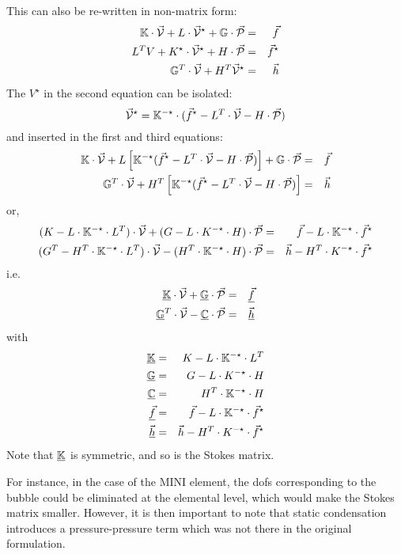 This can also be re-written in non-matrix form:
\begin{eqnarray}
{\mathbb{K}} \cdot \vec{\cal V} + L \cdot \vec{\cal V}^\star + {\mathbb{G}} \cdot \vec{\cal P} &=& \vec{f} \\
L^T V + K^\star \cdot  \vec{\cal V}^\star + H \cdot \vec{\cal P} &=& \vec{f}^\star \\
{\mathbb{G}}^T \cdot \vec{\cal V} + H^T \vec{\cal V}^\star &=& \vec{h}
\end{eqnarray}
The $V^\star$ in the second equation can be isolated:
\[
\vec{\cal V}^\star = {\mathbb{K}}^{-\star} \cdot ( \vec{f}^\star - L^T \cdot \vec{\cal V} - H \cdot \vec{\cal P})
\]
and inserted in the first and third equations:
\begin{eqnarray}
{\mathbb{K}} \cdot \vec{\cal V} + L \left[ {\mathbb{K}}^{-\star} ( \vec{f}^\star - L^T \cdot \vec{\cal V} - H \cdot \vec{\cal P} )  \right] + {\mathbb{G}} \cdot \vec{\cal P} &=& \vec{f} \\
{\mathbb{G}}^T \cdot \vec{\cal V} + H^T \left[  {\mathbb{K}}^{-\star} ( \vec{f}^\star - L^T \cdot \vec{\cal V} - H \cdot \vec{\cal P}) \right]  &=& \vec{h}
\end{eqnarray}
or,
\begin{eqnarray}
(K-L\cdot {\mathbb{K}}^{-\star} \cdot L^T)\cdot \vec{\cal V} + (G-L\cdot K^{-\star} \cdot H) \cdot \vec{\cal P} &=& \vec{f}-L\cdot {\mathbb{K}}^{-\star} \cdot \vec{f}^\star \\
(G^T -H^T\cdot {\mathbb{K}}^{-\star}\cdot  L^T ) \cdot \vec{\cal V}  - 
(H^T \cdot {\mathbb{K}}^{-\star} \cdot H )\cdot \vec{\cal P}   &=& \vec{h} -H^T\cdot K^{-\star}\cdot \vec{f}^\star
\end{eqnarray}
i.e.
\begin{eqnarray}
\underline{{\mathbb{K}}} \cdot \vec{\cal V} + \underline{{\mathbb{G}}}\cdot \vec{\cal P} &=& \underline{\vec{f}} \\
\underline{{\mathbb{G}}}^T \cdot \vec{\cal V} - \underline{{\mathbb{C}}} \cdot \vec{\cal P} &=& \underline{\vec{h}}
\end{eqnarray}
with
\begin{eqnarray}
\underline{{\mathbb{K}}}&=& K-L\cdot {\mathbb{K}}^{-\star} \cdot L^T \\
\underline{{\mathbb{G}}}&=& G-L\cdot K^{-\star} \cdot H \\
\underline{{\mathbb{C}}}&=& H^T \cdot {\mathbb{K}}^{-\star} \cdot H \\
\underline{\vec{f}}&=& \vec{f}-L\cdot {\mathbb{K}}^{-\star} \cdot \vec{f}^\star \\
\underline{\vec{h}}&=& \vec{h} -H^T\cdot K^{-\star}\cdot \vec{f}^\star
\end{eqnarray}
Note that $\underline{{\mathbb{K}}}$ is symmetric, and so is the Stokes matrix.


For instance, in the case of the MINI element, the dofs corresponding to the bubble 
could be eliminated at the elemental level, which would make the Stokes matrix smaller. 
However, it is then important to note that static condensation introduces a 
pressure-pressure term which was not there in the original formulation.










